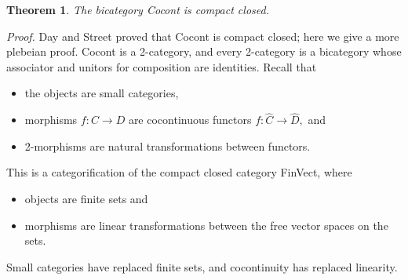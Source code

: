 \documentclass[12pt,twoside,openright]{report}
\newtheorem{thm}{Theorem}
\begin{document}
\begin{thm}
  The bicategory Cocont is compact closed.
\end{thm}
{\em Proof.} Day and Street \cite{DS97} proved that Cocont is compact closed; here we give a more plebeian proof.  Cocont is a 2-category, and every 2-category is a bicategory whose associator and unitors for composition are identities.  Recall that
\begin{itemize}
  \item the objects are small categories,
  \item morphisms $f:C \to D$ are cocontinuous functors $f:\widehat{C}
\to \widehat{D},$ and
  \item 2-morphisms are natural transformations between functors.
\end{itemize}
This is a categorification of the compact closed category FinVect, where
\begin{itemize}
  \item objects are finite sets and
  \item morphisms are linear transformations between the free vector spaces on the sets.
\end{itemize}
Small categories have replaced finite sets, and cocontinuity has replaced linearity.
\end{document}
